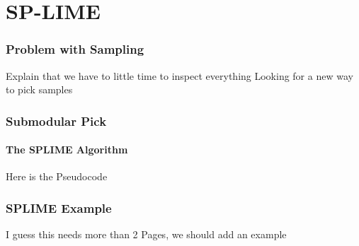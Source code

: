 \section{SP-LIME}

\begin{frame}
	\frametitle{Problem with Sampling}
	Explain that we have to little time to inspect everything
	Looking for a new way to pick samples
\end{frame}

\begin{frame}
	\frametitle{Submodular Pick}
	\framesubtitle{The SPLIME Algorithm}
	Here is the Pseudocode
\end{frame}

\begin{frame}
	\frametitle{SPLIME Example}
	I guess this needs more than 2 Pages, we should add an example 
\end{frame}